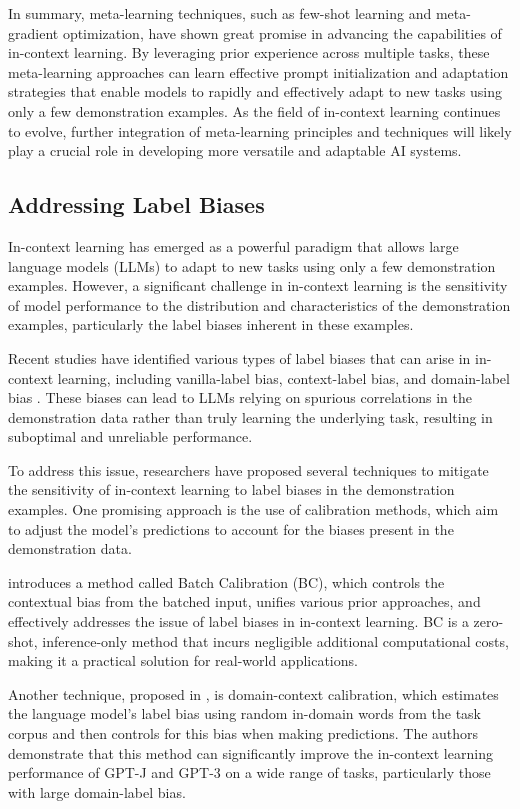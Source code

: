 \documentclass[11pt]{article}
\begin{document}
In summary, meta-learning techniques, such as few-shot learning and meta-gradient optimization, have shown great promise in advancing the capabilities of in-context learning. By leveraging prior experience across multiple tasks, these meta-learning approaches can learn effective prompt initialization and adaptation strategies that enable models to rapidly and effectively adapt to new tasks using only a few demonstration examples. As the field of in-context learning continues to evolve, further integration of meta-learning principles and techniques will likely play a crucial role in developing more versatile and adaptable AI systems.

\subsection{Addressing Label Biases}

In-context learning has emerged as a powerful paradigm that allows large language models (LLMs) to adapt to new tasks using only a few demonstration examples. However, a significant challenge in in-context learning is the sensitivity of model performance to the distribution and characteristics of the demonstration examples, particularly the label biases inherent in these examples.

Recent studies have identified various types of label biases that can arise in in-context learning, including vanilla-label bias, context-label bias, and domain-label bias \cite{ref87}. These biases can lead to LLMs relying on spurious correlations in the demonstration data rather than truly learning the underlying task, resulting in suboptimal and unreliable performance.

To address this issue, researchers have proposed several techniques to mitigate the sensitivity of in-context learning to label biases in the demonstration examples. One promising approach is the use of calibration methods, which aim to adjust the model's predictions to account for the biases present in the demonstration data.

\cite{ref88} introduces a method called Batch Calibration (BC), which controls the contextual bias from the batched input, unifies various prior approaches, and effectively addresses the issue of label biases in in-context learning. BC is a zero-shot, inference-only method that incurs negligible additional computational costs, making it a practical solution for real-world applications.

Another technique, proposed in \cite{ref87}, is domain-context calibration, which estimates the language model's label bias using random in-domain words from the task corpus and then controls for this bias when making predictions. The authors demonstrate that this method can significantly improve the in-context learning performance of GPT-J and GPT-3 on a wide range of tasks, particularly those with large domain-label bias.
\end{document}
